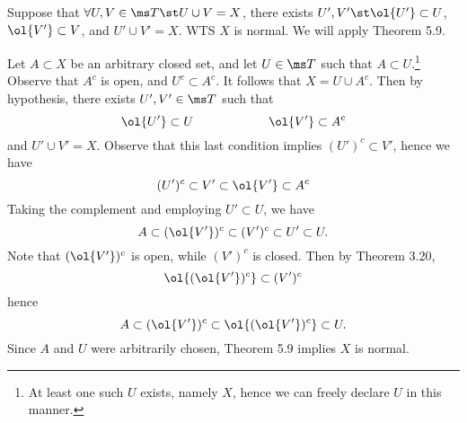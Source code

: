 \documentclass{fkpset}
\begin{document}
\begin{solution}
\begin{iffproof}
      \item Suppose that $\forall U,V \in \ms T \st U \cup V = X$,
        there exists $U', V' \st \ol{U'} \subset U$, $\ol{V'} \subset
        V$, and $U' \cup V' = X$. WTS $X$ is normal. We will apply
        Theorem 5.9.

        Let $A \subset X$ be an arbitrary closed set, and let $U \in
        \ms T$ such that $A \subset U$.\footnote{At least one such $U$
          exists, namely $X$, hence we can freely declare $U$ in this
          manner.} Observe that $A^c$ is open, and $U^c \subset A^c$.
        It follows that $X = U \cup A^c$. Then by hypothesis, there
        exists $U',V' \in \ms T$ such that
        \[
          \ol{U'} \subset U \qquad \qquad \qquad \ol{V'} \subset A^c
        \]
        and $U' \cup V' = X$. Observe that this last condition implies
        $(U')^c \subset V'$, hence we have
        \[
          (U')^c \subset V' \subset \ol{V'} \subset A^c
        \]
        Taking the complement and employing $U' \subset U$, we have
        \[
          A \subset (\ol{V'})^c \subset (V')^c \subset U' \subset U.
        \]
        Note that $(\ol{V'})^c$ is open, while $(V')^c$ is closed.
        Then by Theorem 3.20,
        \[
          \ol{(\ol{V'})^c} \subset (V')^c
        \]
        hence
        \[
          A \subset (\ol{V'})^c \subset \ol{(\ol{V'})^c} \subset U.
        \]
        Since $A$ and $U$ were arbitrarily chosen, Theorem 5.9 implies
        $X$ is normal.
    \end{iffproof}
  \end{solution}
  \clearpage
\end{document}
